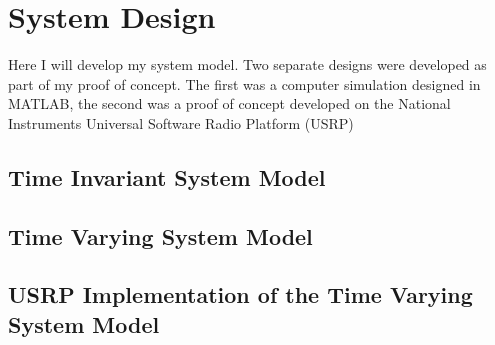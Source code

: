 \chapter{System Design}

Here I will develop my system model. Two separate designs were %
developed as part of my proof of concept. The first was a %
computer simulation designed in MATLAB, the second was a %
proof of concept developed on the National Instruments %
Universal Software Radio Platform (USRP) %


\section{Time Invariant System Model}


\section{Time Varying System Model}



\section{USRP Implementation of the Time Varying System Model}



